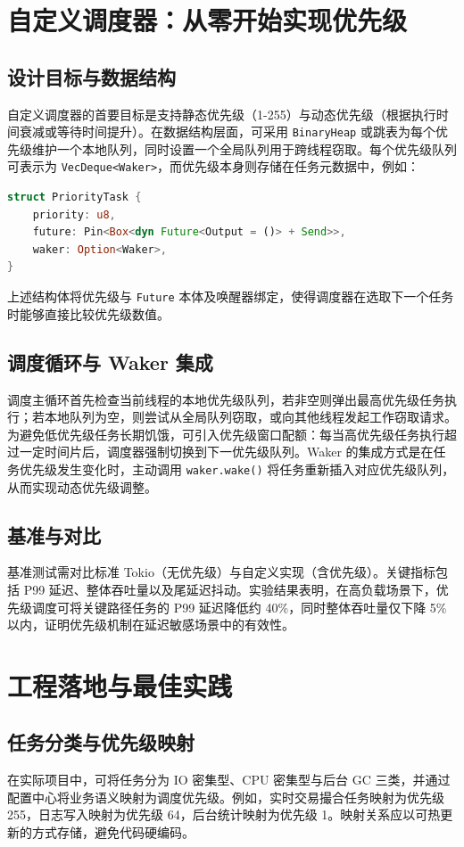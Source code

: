 \chapter{自定义调度器：从零开始实现优先级}
\section{设计目标与数据结构}
自定义调度器的首要目标是支持静态优先级（1-255）与动态优先级（根据执行时间衰减或等待时间提升）。在数据结构层面，可采用 \texttt{BinaryHeap} 或跳表为每个优先级维护一个本地队列，同时设置一个全局队列用于跨线程窃取。每个优先级队列可表示为 \texttt{VecDeque<Waker>}，而优先级本身则存储在任务元数据中，例如：\par
\begin{lstlisting}[language=rust]
struct PriorityTask {
    priority: u8,
    future: Pin<Box<dyn Future<Output = ()> + Send>>,
    waker: Option<Waker>,
}
\end{lstlisting}
上述结构体将优先级与 \texttt{Future} 本体及唤醒器绑定，使得调度器在选取下一个任务时能够直接比较优先级数值。\par
\section{调度循环与 Waker 集成}
调度主循环首先检查当前线程的本地优先级队列，若非空则弹出最高优先级任务执行；若本地队列为空，则尝试从全局队列窃取，或向其他线程发起工作窃取请求。为避免低优先级任务长期饥饿，可引入优先级窗口配额：每当高优先级任务执行超过一定时间片后，调度器强制切换到下一优先级队列。Waker 的集成方式是在任务优先级发生变化时，主动调用 \texttt{waker.wake()} 将任务重新插入对应优先级队列，从而实现动态优先级调整。\par
\section{基准与对比}
基准测试需对比标准 Tokio（无优先级）与自定义实现（含优先级）。关键指标包括 P99 延迟、整体吞吐量以及尾延迟抖动。实验结果表明，在高负载场景下，优先级调度可将关键路径任务的 P99 延迟降低约 40\%{}，同时整体吞吐量仅下降 5\%{} 以内，证明优先级机制在延迟敏感场景中的有效性。\par
\chapter{工程落地与最佳实践}
\section{任务分类与优先级映射}
在实际项目中，可将任务分为 IO 密集型、CPU 密集型与后台 GC 三类，并通过配置中心将业务语义映射为调度优先级。例如，实时交易撮合任务映射为优先级 255，日志写入映射为优先级 64，后台统计映射为优先级 1。映射关系应以可热更新的方式存储，避免代码硬编码。\par
